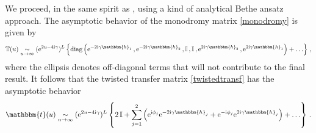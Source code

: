 \documentclass[12pt]{article}
\numberwithin{equation}{section}
\newcommand{\ri}{{\rm i}}
\newcommand{\re}{{\rm e}}
\newcommand{\id}{\mathbb{I}}
\begin{document}
We proceed, in the same spirit as \cite{Resh87},
using a kind of analytical Bethe ansatz approach. The asymptotic behavior of the monodromy matrix \eqref{monodromy} is given by
\begin{equation}
     \mathbb{T}(u)\underset{u\rightarrow \infty}{\sim}  (\re^{2u-4\ri\gamma})^L \left\{ \text{diag}\left( \re^{-2\ri\gamma \mathbbm{h}_1}\,, \re^{-2\ri\gamma \mathbbm{h}_2} \,, \id \,, \id \,, \re^{2\ri\gamma \mathbbm{h}_2} \,, \re^{2\ri\gamma \mathbbm{h}_1}\right) + \ldots \right\}\,,
\end{equation}
where the ellipsis denotes off-diagonal terms that will not contribute to the final result.
It follows that the twisted transfer matrix \eqref{twistedtransf} has the asymptotic behavior 
\begin{equation}
     \mathbbm{t}(u)\underset{u\rightarrow \infty}{\sim}  (\re^{2u-4\ri\gamma})^L \left\{ 
    2\, \id + \sum_{j=1}^2 \left( \re^{\ri \phi_j} \re^{-2\ri\gamma \mathbbm{h}_j} + \re^{-\ri \phi_j} \re^{2\ri\gamma \mathbbm{h}_j} \right) + \ldots \right\} \,.
    \label{transfasym}
\end{equation}
\end{document}
